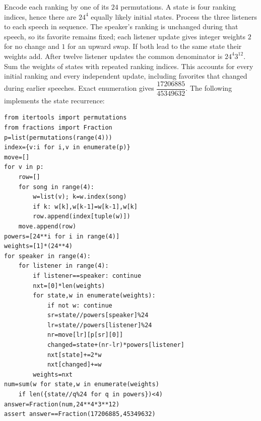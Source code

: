 Encode each ranking by one of its $24$ permutations. A state is four ranking indices, hence there are $24^4$ equally likely initial states. Process the three listeners to each speech in sequence. The speaker's ranking is unchanged during that speech, so its favorite remains fixed; each listener update gives integer weights $2$ for no change and $1$ for an upward swap. If both lead to the same state their weights add. After twelve listener updates the common denominator is $24^4 3^{12}$. Sum the weights of states with repeated ranking indices. This accounts for every initial ranking and every independent update, including favorites that changed during earlier speeches. Exact enumeration gives $\boxed{\dfrac{17206885}{45349632}}$. The following implements the state recurrence:
\begin{verbatim}
from itertools import permutations
from fractions import Fraction
p=list(permutations(range(4)))
index={v:i for i,v in enumerate(p)}
move=[]
for v in p:
    row=[]
    for song in range(4):
        w=list(v); k=w.index(song)
        if k: w[k],w[k-1]=w[k-1],w[k]
        row.append(index[tuple(w)])
    move.append(row)
powers=[24**i for i in range(4)]
weights=[1]*(24**4)
for speaker in range(4):
    for listener in range(4):
        if listener==speaker: continue
        nxt=[0]*len(weights)
        for state,w in enumerate(weights):
            if not w: continue
            sr=state//powers[speaker]%24
            lr=state//powers[listener]%24
            nr=move[lr][p[sr][0]]
            changed=state+(nr-lr)*powers[listener]
            nxt[state]+=2*w
            nxt[changed]+=w
        weights=nxt
num=sum(w for state,w in enumerate(weights)
    if len({state//q%24 for q in powers})<4)
answer=Fraction(num,24**4*3**12)
assert answer==Fraction(17206885,45349632)
\end{verbatim}

